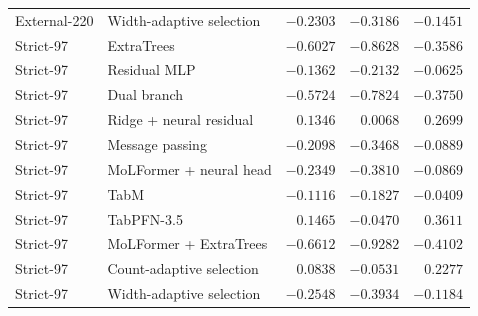 \begin{longtable}{@{}lp{5.3cm}rrr@{}}
External-220 & Width-adaptive selection & $-0.2303$ & $-0.3186$ & $-0.1451$ \\
Strict-97 & ExtraTrees & $-0.6027$ & $-0.8628$ & $-0.3586$ \\
Strict-97 & Residual MLP & $-0.1362$ & $-0.2132$ & $-0.0625$ \\
Strict-97 & Dual branch & $-0.5724$ & $-0.7824$ & $-0.3750$ \\
Strict-97 & Ridge + neural residual & $0.1346$ & $0.0068$ & $0.2699$ \\
Strict-97 & Message passing & $-0.2098$ & $-0.3468$ & $-0.0889$ \\
Strict-97 & MoLFormer + neural head & $-0.2349$ & $-0.3810$ & $-0.0869$ \\
Strict-97 & TabM & $-0.1116$ & $-0.1827$ & $-0.0409$ \\
Strict-97 & TabPFN-3.5 & $0.1465$ & $-0.0470$ & $0.3611$ \\
Strict-97 & MoLFormer + ExtraTrees & $\mathbf{-0.6612}$ & $-0.9282$ & $-0.4102$ \\
Strict-97 & Count-adaptive selection & $0.0838$ & $-0.0531$ & $0.2277$ \\
Strict-97 & Width-adaptive selection & $-0.2548$ & $-0.3934$ & $-0.1184$ \\
\bottomrule\end{longtable}
